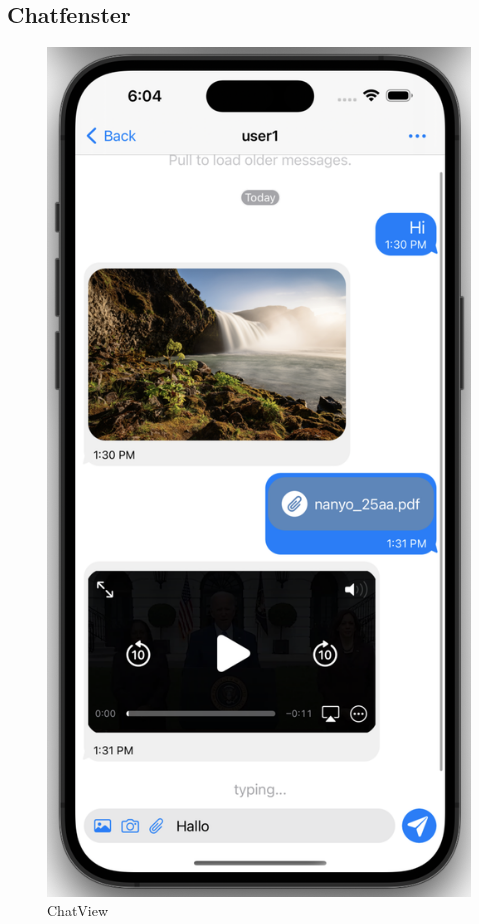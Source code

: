     \newpage
    \subsection{Chatfenster}

    \begin{figure}[h]
        \includegraphics[scale=0.5]{chat}
        \centering
        \caption{ChatView}\label{fig:chatview}
    \end{figure}

